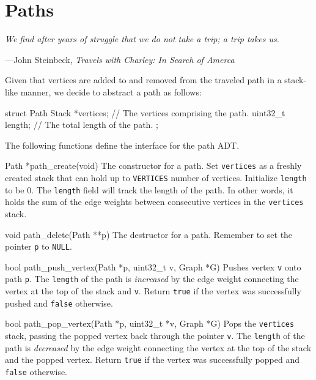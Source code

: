 \section{Paths}

\textwidth \epigraph{\emph{We find after years of
struggle that we do not take a trip; a trip takes us.} }{---John
Steinbeck, \emph{Travels with Charley: In Search of Amerca}}

\noindent
Given that vertices are added to and removed from the traveled path in a
stack-like manner, we decide to abstract a path as follows:

\begin{clisting}{}
struct Path {
    Stack *vertices; // The vertices comprising the path.
    uint32_t length; // The total length of the path.
};
\end{clisting}

The following functions define the interface for the path ADT.

\begin{funcdoc}{Path *path\_create(void)}
  The constructor for a path. Set \texttt{vertices} as a freshly created
  stack that can hold up to \texttt{VERTICES} number of vertices.
  Initialize \texttt{length} to be 0. The \texttt{length} field will
  track the length of the path. In other words, it holds the sum of the
  edge weights between consecutive vertices in the \texttt{vertices}
  stack.
\end{funcdoc}

\begin{funcdoc}{void path\_delete(Path **p)}
  The destructor for a path. Remember to set the pointer \texttt{p} to
  \texttt{NULL}.
\end{funcdoc}

\begin{funcdoc}{bool path\_push\_vertex(Path *p, uint32\_t v, Graph
*G)}
Pushes vertex \texttt{v} onto path \texttt{p}. The \texttt{length} of the
path is \emph{increased} by the edge weight connecting the vertex at the top of
the stack and \texttt{v}. Return \texttt{true} if the vertex was
successfully pushed and \texttt{false} otherwise.
\end{funcdoc}

\begin{funcdoc}{bool path\_pop\_vertex(Path *p, uint32\_t *v, Graph
*G)}
  Pops the \texttt{vertices} stack, passing the popped vertex back through
  the pointer \texttt{v}. The \texttt{length} of the path is
  \emph{decreased} by the edge weight connecting the vertex at the top of
  the stack and the popped vertex. Return \texttt{true} if the vertex was
  successfully popped and \texttt{false} otherwise.
\end{funcdoc}

